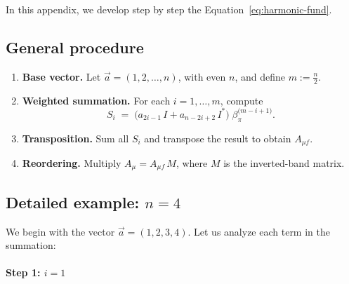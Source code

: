 \documentclass{article}
\begin{document}
In this appendix, we develop step by step the Equation~\eqref{eq:harmonic-fund}. %


\subsection{General procedure}

\begin{enumerate}
  \item \textbf{Base vector.} Let
        \(\vec{a} = (1, 2, \dots, n)\), with even \(n\), and define
        \(m := \tfrac{n}{2}\).
  \item \textbf{Weighted summation.} For each \(i = 1, \dots, m\), compute
        \[
          S_i \;=\;
          \bigl(a_{2i - 1}\,I + a_{n - 2i + 2}\,I^*\bigr)\;
          \beta_{\pi}^{\bigl(m - i + 1\bigr)}.
        \]
  \item \textbf{Transposition.} Sum all \(S_i\) and transpose the result to obtain \(A_{\mu f}\).
  \item \textbf{Reordering.} Multiply
        \(A_\mu = A_{\mu f}\,M\), where \(M\) is the inverted-band matrix.
\end{enumerate}

\subsection{Detailed example: \(n = 4\)}

We begin with the vector \(\vec{a} = (1, 2, 3, 4)\). Let us analyze each term in the summation:
\paragraph{Step 1: $i = 1$}
\end{document}
